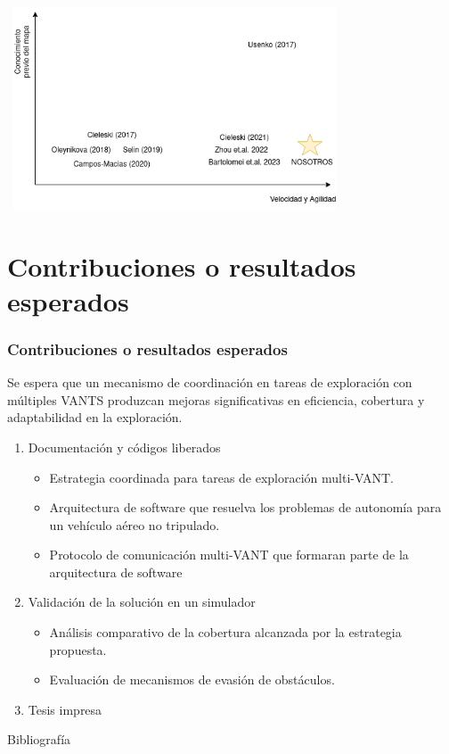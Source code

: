 \documentclass[
  24pt, %
  aspectratio=169, %
]{beamer}
\begin{document}
\begin{frame}
  \centering
  \includegraphics[width=10cm, height=6cm]{soa}
\end{frame}

\section{Contribuciones o resultados esperados}
\begin{frame}
  \frametitle{Contribuciones o resultados esperados}
  Se espera que un mecanismo de coordinación en tareas de exploración con múltiples VANTS produzcan mejoras significativas en eficiencia, cobertura y adaptabilidad en la exploración.
  \begin{enumerate}
  \item<1-> Documentación y códigos liberados
    \begin{itemize}
    \item Estrategia coordinada para tareas de exploración multi-VANT.
    \item Arquitectura de software que resuelva los problemas de autonomía para un vehículo aéreo no tripulado.
    \item Protocolo de comunicación multi-VANT que formaran parte de la arquitectura de software
    \end{itemize}
  \item<2-> Validación de la solución en un simulador
    \begin{itemize}
    \item Análisis comparativo de la cobertura alcanzada por la estrategia propuesta.
    \item Evaluación de mecanismos de evasión de obstáculos.
    \end{itemize}
  \item<3-> Tesis impresa
  \end{enumerate}
\end{frame}

\begin{frame}{Bibliografía}
  \tiny
  
  
\end{frame}
\end{document}
